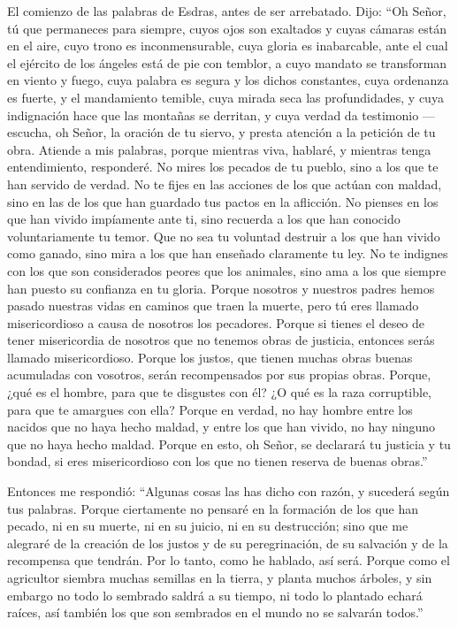 El comienzo de las palabras de Esdras, antes de ser arrebatado. Dijo:
 ``Oh Señor, tú que permaneces para siempre, cuyos ojos
son exaltados y cuyas cámaras están en el aire,  cuyo
trono es inconmensurable, cuya gloria es inabarcable, ante el cual el
ejército de los ángeles está de pie con temblor,  a cuyo
mandato se transforman en viento y fuego, cuya palabra es segura y los
dichos constantes, cuya ordenanza es fuerte, y el mandamiento temible,
 cuya mirada seca las profundidades, y cuya indignación
hace que las montañas se derritan, y cuya verdad da testimonio ---
 escucha, oh Señor, la oración de tu siervo, y presta
atención a la petición de tu obra.  Atiende a mis
palabras, porque mientras viva, hablaré, y mientras tenga entendimiento,
responderé.  No mires los pecados de tu pueblo, sino a
los que te han servido de verdad.  No te fijes en las
acciones de los que actúan con maldad, sino en las de los que han
guardado tus pactos en la aflicción.  No pienses en los
que han vivido impíamente ante ti, sino recuerda a los que han conocido
voluntariamente tu temor.  Que no sea tu voluntad
destruir a los que han vivido como ganado, sino mira a los que han
enseñado claramente tu ley.  No te indignes con los que
son considerados peores que los animales, sino ama a los que siempre han
puesto su confianza en tu gloria.  Porque nosotros y
nuestros padres hemos pasado nuestras vidas en caminos que traen la
muerte, pero tú eres llamado misericordioso a causa de nosotros los
pecadores.  Porque si tienes el deseo de tener
misericordia de nosotros que no tenemos obras de justicia, entonces
serás llamado misericordioso.  Porque los justos, que
tienen muchas obras buenas acumuladas con vosotros, serán recompensados
por sus propias obras.  Porque, ¿qué es el hombre, para
que te disgustes con él? ¿O qué es la raza corruptible, para que te
amargues con ella?  Porque en verdad, no hay hombre entre
los nacidos que no haya hecho maldad, y entre los que han vivido, no hay
ninguno que no haya hecho maldad.  Porque en esto, oh
Señor, se declarará tu justicia y tu bondad, si eres misericordioso con
los que no tienen reserva de buenas obras.''

 Entonces me respondió: ``Algunas cosas las has dicho con
razón, y sucederá según tus palabras.  Porque ciertamente
no pensaré en la formación de los que han pecado, ni en su muerte, ni en
su juicio, ni en su destrucción;  sino que me alegraré de
la creación de los justos y de su peregrinación, de su salvación y de la
recompensa que tendrán.  Por lo tanto, como he hablado,
así será.  Porque como el agricultor siembra muchas
semillas en la tierra, y planta muchos árboles, y sin embargo no todo lo
sembrado saldrá a su tiempo, ni todo lo plantado echará raíces, así
también los que son sembrados en el mundo no se salvarán todos.''

